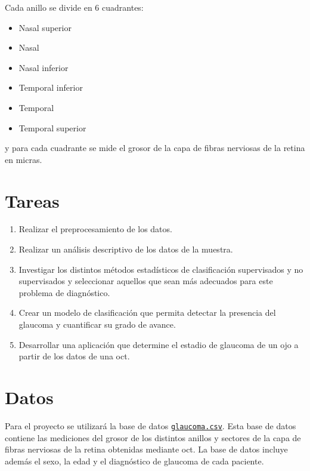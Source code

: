 \documentclass[
  a4paper,
]{scrreport}
\providecommand{\tightlist}{%
  \setlength{\itemsep}{0pt}\setlength{\parskip}{0pt}}\usepackage{longtable,booktabs,array}
\begin{document}
Cada anillo se divide en 6 cuadrantes:

\begin{itemize}
\tightlist
\item
  Nasal superior
\item
  Nasal
\item
  Nasal inferior
\item
  Temporal inferior
\item
  Temporal
\item
  Temporal superior
\end{itemize}

y para cada cuadrante se mide el grosor de la capa de fibras nerviosas
de la retina en micras.

\hypertarget{tareas}{%
\section{Tareas}\label{tareas}}

\begin{enumerate}
\def\labelenumi{\arabic{enumi}.}
\tightlist
\item
  Realizar el preprocesamiento de los datos.
\item
  Realizar un análisis descriptivo de los datos de la muestra.
\item
  Investigar los distintos métodos estadísticos de clasificación
  supervisados y no supervisados y seleccionar aquellos que sean más
  adecuados para este problema de diagnóstico.
\item
  Crear un modelo de clasificación que permita detectar la presencia del
  glaucoma y cuantificar su grado de avance.
\item
  Desarrollar una aplicación que determine el estadio de glaucoma de un
  ojo a partir de los datos de una oct.
\end{enumerate}

\hypertarget{datos}{%
\section{Datos}\label{datos}}

Para el proyecto se utilizará la base de datos
\href{datos/glaucoma.csv}{\texttt{glaucoma.csv}}. Esta base de datos
contiene las mediciones del grosor de los distintos anillos y sectores
de la capa de fibras nerviosas de la retina obtenidas mediante oct. La
base de datos incluye además el sexo, la edad y el diagnóstico de
glaucoma de cada paciente.
\end{document}
